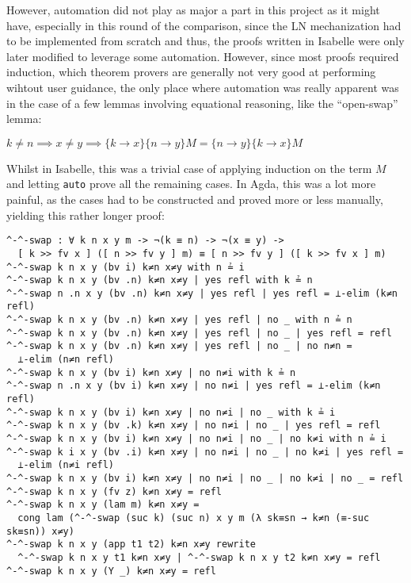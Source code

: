 \documentclass[a4paper, 12pt, twoside]{style/ociamthesis}
\theoremstyle{plain}
\newtheorem{Lemma}{Lemma}[chapter]
\theoremstyle{definition}
\theoremstyle{remark}
\renewenvironment{Lemma}{\begin{OldLemma}\begin{mdframed}[style=example, linecolor=cyan]}{\end{mdframed}\end{OldLemma}}
\begin{document}
However, automation did not play as major a part in this project as it
might have, especially in this round of the comparison, since the LN
mechanization had to be implemented from scratch and thus, the proofs
written in Isabelle were only later modified to leverage some
automation. However, since most proofs required induction, which theorem
provers are generally not very good at performing wihtout user guidance,
the only place where automation was really apparent was in the case of a
few lemmas involving equational reasoning, like the ``open-swap'' lemma:

\begin{Lemma}

\label{Lemma:opnSwap}
\(k \neq n \implies x \neq y \implies \{k \to x\}\{n \to y\}M = \{n \to y\}\{k \to x\}M\)

\end{Lemma}

Whilst in Isabelle, this was a trivial case of applying induction on the
term \(M\) and letting \texttt{auto} prove all the remaining cases. In
Agda, this was a lot more painful, as the cases had to be constructed
and proved more or less manually, yielding this rather longer proof:

\begin{verbatim}
^-^-swap : ∀ k n x y m -> ¬(k ≡ n) -> ¬(x ≡ y) -> 
  [ k >> fv x ] ([ n >> fv y ] m) ≡ [ n >> fv y ] ([ k >> fv x ] m)
^-^-swap k n x y (bv i) k≠n x≠y with n ≟ i
^-^-swap k n x y (bv .n) k≠n x≠y | yes refl with k ≟ n
^-^-swap n .n x y (bv .n) k≠n x≠y | yes refl | yes refl = ⊥-elim (k≠n refl)
^-^-swap k n x y (bv .n) k≠n x≠y | yes refl | no _ with n ≟ n
^-^-swap k n x y (bv .n) k≠n x≠y | yes refl | no _ | yes refl = refl
^-^-swap k n x y (bv .n) k≠n x≠y | yes refl | no _ | no n≠n = 
  ⊥-elim (n≠n refl)
^-^-swap k n x y (bv i) k≠n x≠y | no n≠i with k ≟ n
^-^-swap n .n x y (bv i) k≠n x≠y | no n≠i | yes refl = ⊥-elim (k≠n refl)
^-^-swap k n x y (bv i) k≠n x≠y | no n≠i | no _ with k ≟ i
^-^-swap k n x y (bv .k) k≠n x≠y | no n≠i | no _ | yes refl = refl
^-^-swap k n x y (bv i) k≠n x≠y | no n≠i | no _ | no k≠i with n ≟ i
^-^-swap k i x y (bv .i) k≠n x≠y | no n≠i | no _ | no k≠i | yes refl = 
  ⊥-elim (n≠i refl)
^-^-swap k n x y (bv i) k≠n x≠y | no n≠i | no _ | no k≠i | no _ = refl
^-^-swap k n x y (fv z) k≠n x≠y = refl
^-^-swap k n x y (lam m) k≠n x≠y = 
  cong lam (^-^-swap (suc k) (suc n) x y m (λ sk≡sn → k≠n (≡-suc sk≡sn)) x≠y)
^-^-swap k n x y (app t1 t2) k≠n x≠y rewrite
  ^-^-swap k n x y t1 k≠n x≠y | ^-^-swap k n x y t2 k≠n x≠y = refl
^-^-swap k n x y (Y _) k≠n x≠y = refl
\end{verbatim}
\end{document}
